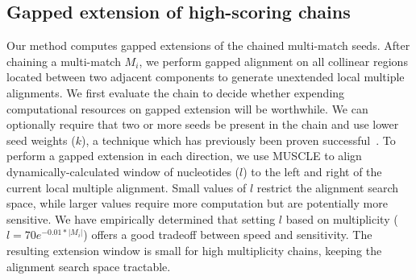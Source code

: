 \documentclass[9.5pt,journal,final,finalsubmission,twocolumn]{IEEEtran}
\begin{document}
\subsection{Gapped extension of high-scoring chains}
Our method computes gapped extensions of the chained multi-match seeds.
After chaining a multi-match $M_i$, we perform gapped alignment on all
collinear regions located between two adjacent components to generate
unextended local multiple alignments. We first evaluate the chain to
decide whether expending computational resources on gapped extension
will be worthwhile. We can optionally require that two or more seeds be present
in the chain and use lower seed weights ($k$), a technique which has
previously been proven
successful~\cite{ref-blastz,ref-gappedblast,ref-blat}.  To perform a
gapped extension in each direction, we use MUSCLE to align dynamically-calculated window
of nucleotides ($l$) to the left and right of the current local
multiple alignment.  Small values of $l$ restrict the alignment search
space, while larger values require more computation but are
potentially more sensitive.  We have empirically determined that
setting $l$ based on multiplicity ($l = 70e^{-0.01*|M_{i}|}$) offers a
good tradeoff between speed and sensitivity.  The resulting extension
window is small for high multiplicity chains,
keeping the alignment search space tractable.
\end{document}
